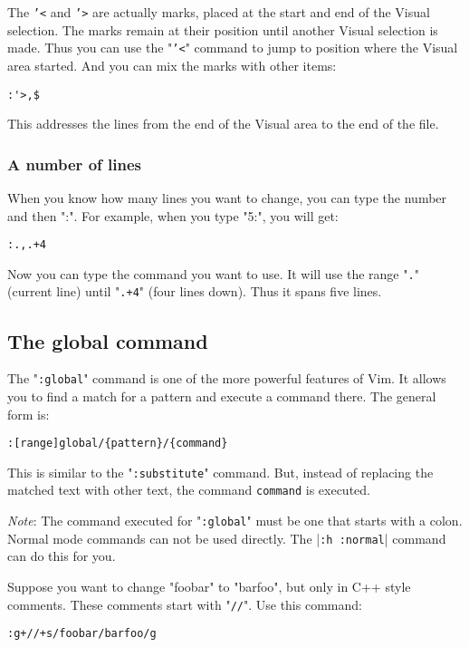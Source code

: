 {{The \texttt{'<} and \texttt{'>} are actually marks, placed at the start and end of the Visual selection.
The marks remain at their position until another Visual selection is made.
Thus you can use the "\texttt{'<}" command to jump to position where the Visual area started.
And you can mix the marks with other items:

\begin{Verbatim}[samepage=true]
 :'>,$
\end{Verbatim}

This addresses the lines from the end of the Visual area to the end of the file.
\subsubsection{A number of lines}
When you know how many lines you want to change, you can type the number and then ":".
For example, when you type "5:", you will get:

\begin{Verbatim}[samepage=true]
 :.,.+4
\end{Verbatim}

Now you can type the command you want to use.
It will use the range "\texttt{.}" (current line) until "\texttt{.+4}" (four lines down).
Thus it spans five lines.

\subsection{The global command}
The "\texttt{:global}" command is one of the more powerful features of Vim.
It allows you to find a match for a pattern and execute a command there.
The general form is:

\begin{Verbatim}[samepage=true]
 :[range]global/{pattern}/{command}
\end{Verbatim}

This is similar to the "\texttt{:substitute}" command.
But, instead of replacing the matched text with other text, the command \texttt{{command}} is executed.

\emph{Note}:
The command executed for "\texttt{:global}" must be one that starts with a colon.
Normal mode commands can not be used directly.
The |\texttt{:h :normal}| command can do this for you.

Suppose you want to change "foobar" to "barfoo", but only in C++ style comments.
These comments start with "\texttt{//}".
Use this command:

\begin{Verbatim}[samepage=true]
 :g+//+s/foobar/barfoo/g
\end{Verbatim}

}}
